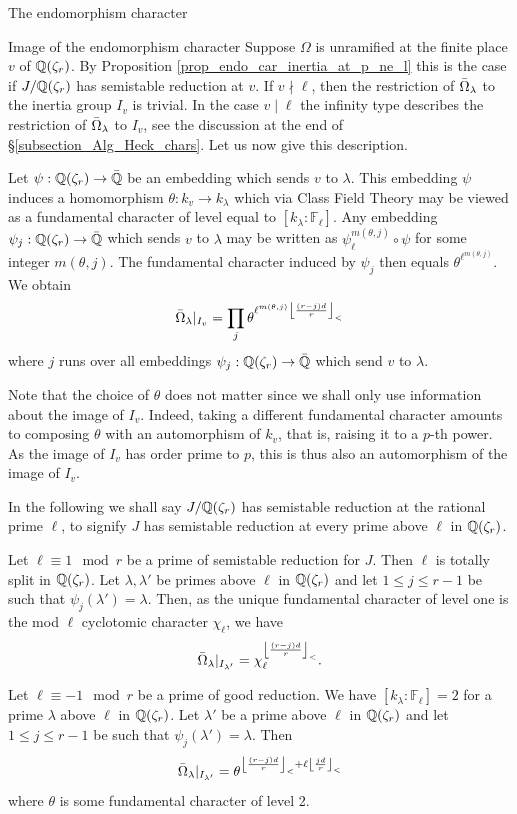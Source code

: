 \documentclass[11pt,a4paper]{article}
\newcommand{\Fl}{\mathbb{F}_\ell}
\newcommand{\Qr}{{\QQ(\zeta_r)}}
\begin{document}
\begin{section}{The endomorphism character}
\begin{subsection}{Image of the endomorphism character}
Suppose $\Omega$ is unramified at the finite place $v $ of $\Qr$. By Proposition \ref{prop_endo_car_inertia_at_p_ne_l} this is the case if $J/\Qr$ has semistable reduction at $v$.
If $v \nmid \ell$, then the restriction of $\Bar{\Omega}_\lambda$ to the inertia group $I_v$ is trivial. In the case $v \mid \ell$ the infinity type describes the restriction of $\Bar{\Omega}_\lambda$ to $I_v$, see the discussion at the end of \S\ref{subsection_Alg_Heck_chars}.
Let us now give this description.

Let $\psi: \Qr \to \Bar{\QQ}$ be an embedding which sends $v$ to $\lambda$. This embedding $\psi$ induces a homomorphism $\theta: k_v \to k_\lambda$ which via Class Field Theory may be viewed as a fundamental character of level equal to $[k_\lambda: \Fl]$.
Any embedding $\psi_j:\Qr \to \Bar{\QQ}$ which sends $v$ to $\lambda$ may be written as $\psi_{\ell}^{m(\theta,j)} \circ \psi$ for some integer $m(\theta,j)$. The fundamental character induced by $\psi_j$ then equals $\theta^{\ell^{m(\theta,j)}}$. We obtain 
\[
\label{equation_inertia_at_l_description}
\Bar{\Omega}_\lambda|_{I_v} = \prod_{j} \theta^{\ell^{m(\theta,j)}\left\lfloor \frac{(r-j)d}{r}\right\rfloor_< }
\]
where $j$ runs over all embeddings $\psi_j: \Qr \to \Bar{\QQ}$ which send $v$ to $\lambda$.

Note that the choice of $\theta$ does not matter since we shall only use information about the image of $I_v$.
Indeed, taking a different fundamental character amounts to composing $\theta$ with an automorphism of $k_v$, that is, raising it to a $p$-th power.
As the image of $I_v$ has order prime to $p$, this is thus also an automorphism of the image of $I_v$.

In the following we shall say $J/\Qr$ has semistable reduction at the rational prime $\ell$, to signify $J$ has semistable reduction at every prime above $\ell$ in $\Qr$.

\begin{example}
\label{inertia_at_l_for_primes_of_res_deg_1_and_2}
Let $\ell \equiv 1 \mod{r}$ be a prime of semistable reduction for $J$. Then $\ell$ is totally split in $\Qr$. Let $\lambda,\lambda'$ be primes above $\ell$ in $\Qr$ and let $1\leq j \leq r-1$ be such that $\psi_j(\lambda') = \lambda$. Then, as the unique fundamental character of level one is the mod $\ell$ cyclotomic character $\chi_\ell$, we have
$$\Bar{\Omega}_\lambda|_{I_{\lambda'}} = \chi_\ell^{\left\lfloor \frac{(r-j)d}{r}\right\rfloor_<} .$$

Let $\ell \equiv -1 \mod{r}$ be a prime of good reduction. We have $[k_\lambda:\Fl]=2$ for a prime $\lambda$ above $\ell$ in $\Qr$. Let $\lambda'$ be a prime above $\ell$ in $\Qr$ and let $1 \leq j \leq r-1$ be such that $\psi_j(\lambda') = \lambda$. Then
$$\Bar{\Omega}_\lambda|_{I_{\lambda'}} = \theta^{\left\lfloor \frac{(r-j)d}{r}\right\rfloor_< + \ell\left\lfloor \frac{jd}{r}\right\rfloor_<} $$
where $\theta$ is some fundamental character of level 2.
\end{example}



\end{subsection}
\end{section}
\end{document}
